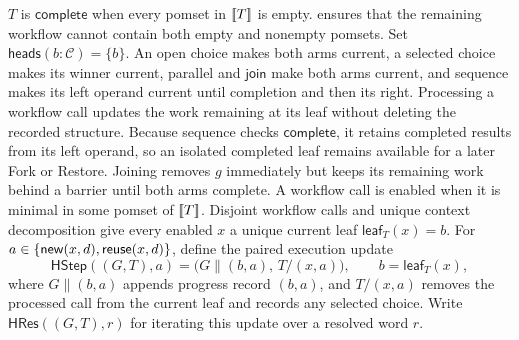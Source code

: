 \(T\) is \(\mathsf{complete}\) when every pomset in \(\mathopen{[\![}T\mathclose{]\!]}\) is empty.
 ensures that the remaining workflow cannot contain both empty and nonempty pomsets.
Set \(\mathsf{heads}(b{:}\mathcal C)=\{b\}\).
An open choice makes both arms current, a selected choice makes its winner current, parallel and \(\mathsf{join}\) make both arms current, and sequence makes its left operand current until completion and then its right.
Processing a workflow call updates the work remaining at its leaf without deleting the recorded structure.
Because sequence checks \(\mathsf{complete}\), it retains completed results from its left operand, so an isolated completed leaf remains available for a later Fork or Restore.
Joining removes \(g\) immediately but keeps its remaining work behind a barrier until both arms complete.
A workflow call is enabled when it is minimal in some pomset of \(\mathopen{[\![}T\mathclose{]\!]}\).
Disjoint workflow calls and unique context decomposition give every enabled \(x\) a unique current leaf \(\mathsf{leaf}_T(x)=b\).
For \(a\in\{\mathsf{new}(x,d),\mathsf{reuse}(x,d)\}\), define the paired execution update
\[
 \mathsf{HStep}((G,T),a)=
 \bigl(G\mathbin{\|}(b,a),\,T/(x,a)\bigr),
 \qquad b=\mathsf{leaf}_T(x),
\]
where \(G\mathbin{\|}(b,a)\) appends progress record \((b,a)\), and \(T/(x,a)\) removes the processed call from the current leaf and records any selected choice.
Write \(\mathsf{HRes}((G,T),r)\) for iterating this update over a resolved word \(r\).

